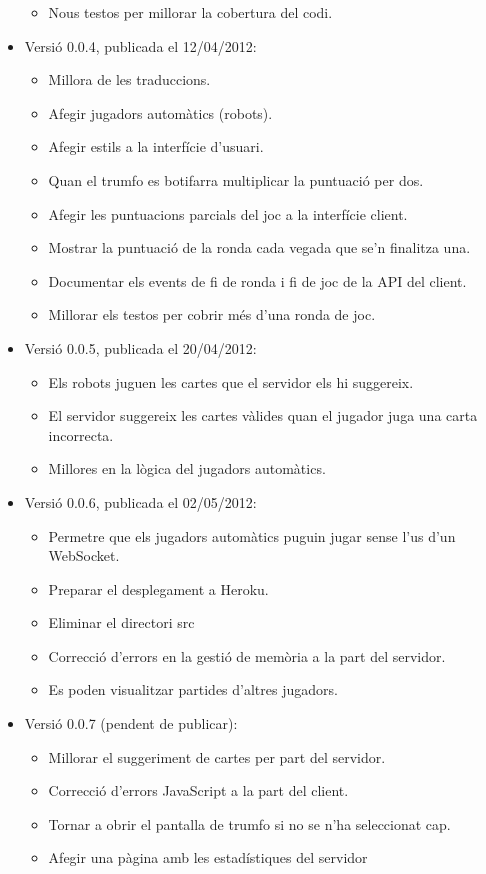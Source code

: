 \begin{itemize}
{\begin{itemize}
        \item{Nous testos per millorar la cobertura del codi.}
    \end{itemize}
}
\item{Versió 0.0.4, publicada el 12/04/2012: 
    \begin{itemize}
        \item{Millora de les traduccions.}
        \item{Afegir jugadors automàtics (robots).}
        \item{Afegir estils a la interfície d'usuari. }
        \item{Quan el trumfo es botifarra multiplicar la puntuació per dos.}
        \item{Afegir les puntuacions parcials del joc a la interfície client.}
        \item{Mostrar la puntuació de la ronda cada vegada que se'n finalitza una.}
        \item{Documentar els events de fi de ronda i fi de joc de la API del client.}
        \item{Millorar els testos per cobrir més d'una ronda de joc.}
    \end{itemize}
}
\item{Versió 0.0.5, publicada el 20/04/2012:
    \begin{itemize}
        \item{Els robots juguen les cartes que el servidor els hi suggereix.}
        \item{El servidor suggereix les cartes vàlides quan el jugador juga una carta incorrecta.}
        \item{Millores en la lògica del jugadors automàtics.}
    \end{itemize}
}
\item{Versió 0.0.6, publicada el 02/05/2012:
    \begin{itemize}
        \item{Permetre que els jugadors automàtics puguin jugar sense l'us d'un WebSocket.}
        \item{Preparar el desplegament a Heroku.}
        \item{Eliminar el directori src}
        \item{Correcció d'errors en la gestió de memòria a la part del servidor.}
        \item{Es poden visualitzar partides d'altres jugadors.}
    \end{itemize}
}
\item{Versió 0.0.7 (pendent de publicar):
    \begin{itemize}
        \item{Millorar el suggeriment de cartes per part del servidor.}
        \item{Correcció d'errors JavaScript a la part del client.}
        \item{Tornar a obrir el pantalla de trumfo si no se n'ha seleccionat cap. }
        \item{Afegir una pàgina amb les estadístiques del servidor}
    \end{itemize}
}
\end{itemize}

